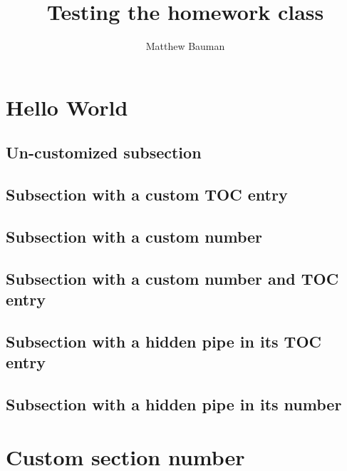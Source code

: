 \documentclass{homework}
\title{Testing the \textsf{homework} class}
\author{Matthew Bauman}
\begin{document}
\maketitle

\tableofcontents

\section{Hello World}

\lipsum[1-2]

\subsection{Un-customized subsection}

\lipsum[3]

\subsection[Custom TOC entry]{Subsection with a custom TOC entry}

\lipsum[4]

\subsection[A-3)|]{Subsection with a custom number}

\lipsum[5]

\subsection[I.d:|Custom number and TOC entry]{Subsection with a custom number and TOC entry}

\lipsum[6]

\subsection[{{Hidden | in TOC}}]{Subsection with a hidden pipe in its TOC entry}

\lipsum[7]

\subsection[{{$\alpha.\phi$|}}|]{Subsection with a hidden pipe in its number}

\lipsum[8]

\section[3x|]{Custom section number}
\end{document}
